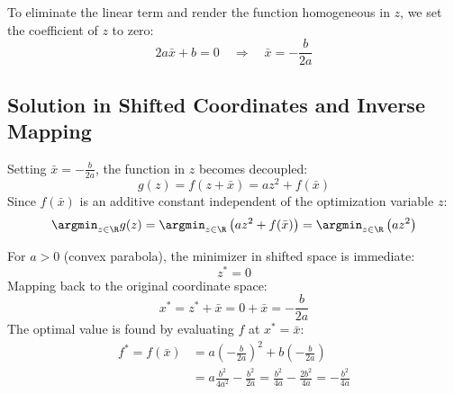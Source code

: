 To eliminate the linear term and render the function homogeneous in $z$, we set the coefficient of $z$ to zero:
\begin{equation}
2a\bar{x} + b = 0 \quad \Longrightarrow \quad \bar{x} = -\frac{b}{2a}
\end{equation}

\subsection{Solution in Shifted Coordinates and Inverse Mapping}
Setting $\bar{x} = -\frac{b}{2a}$, the function in $z$ becomes decoupled:
\begin{equation}
g(z) = f(z + \bar{x}) = az^2 + f(\bar{x})
\end{equation}
Since $f(\bar{x})$ is an additive constant independent of the optimization variable $z$:
\begin{equation}
\argmin_{z \in \R} g(z) = \argmin_{z \in \R} \left( az^2 + f(\bar{x}) \right) = \argmin_{z \in \R} \left( az^2 \right)
\end{equation}

For $a > 0$ (convex parabola), the minimizer in shifted space is immediate:
\begin{equation}
z^* = 0
\end{equation}
Mapping back to the original coordinate space:
\begin{equation}
x^* = z^* + \bar{x} = 0 + \bar{x} = -\frac{b}{2a}
\end{equation}
The optimal value is found by evaluating $f$ at $x^* = \bar{x}$:
\begin{align}
f^* = f(\bar{x}) &= a\left(-\frac{b}{2a}\right)^2 + b\left(-\frac{b}{2a}\right) \nonumber\\
&= a\frac{b^2}{4a^2} - \frac{b^2}{2a} = \frac{b^2}{4a} - \frac{2b^2}{4a} = -\frac{b^2}{4a}
\end{align}


